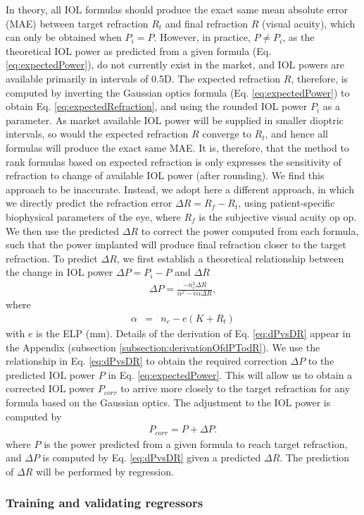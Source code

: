 \documentclass[article,twocolumn,preprint,10pt]{paper}%
\renewcommand{\(}{\left(}
\renewcommand{\)}{\right)}
\renewcommand{\[}{\left[}
\renewcommand{\]}{\right]}
\newcommand{\beq}{\begin{eqnarray}}
\newcommand{\eeq}{\end{eqnarray}}
\newcommand{\1}{\mbox{\boldmath$1$}}
\begin{document}
In theory, all IOL formulas should produce the exact same mean absolute error (MAE) between target refraction $R_t$ and final refraction $R$ (visual acuity), which can only be obtained when $P_i= P $. However, in practice, $P\neq P_i$, as the theoretical IOL power as predicted from a given formula (Eq. \ref{eq:expectedPower}), do not currently exist in the market, and IOL powers are  available primarily in intervals of 0.5D. The expected refraction $R$, therefore, is  computed by inverting the Gaussian optics formula (Eq. \ref{eq:expectedPower}) to obtain Eq. \ref{eq:expectedRefraction}, and using the rounded IOL power $P_i$  as a parameter.
As market available IOL power will be supplied in smaller dioptric intervals, so would the expected refraction $R$ converge to $R_t$, and hence all formulas will produce the exact same MAE. 
It is, therefore, that the method to rank formulas based on expected refraction is only expresses the sensitivity of refraction to change of available IOL power (after rounding). We find this approach to be inaccurate. 
Instead, we adopt here a different approach, in which we directly predict the refraction error $\Delta R = R_f-R_t$, using patient-specific biophysical parameters of the eye, where $R_f$ is the subjective visual acuity op op. We then use the predicted $\Delta R$ to correct the power  computed from each formula, such that the power implanted will produce final refraction closer to the target refraction. 
To predict $\Delta R$, we first establish a theoretical relationship between the change in IOL power $\Delta P=P_i-P$ and $\Delta R $ 
\beq \label{eq:dPvsDR}
\Delta P = \frac{-n_c^2\Delta R}{\alpha^2 -e\alpha\Delta R},
\eeq 
where 
\beq 
\alpha &=& n_c-e(K+R_t)\nonumber 
\eeq 
with $e$ is the ELP (mm). Details of the derivation of Eq. \ref{eq:dPvsDR} appear in the Appendix (subsection \ref{subsection:derivationOfdPTodR}).
We use the relationship in Eq. \ref{eq:dPvsDR} to obtain the required correction $\Delta P$ to the predicted  IOL power $P$ in Eq. \ref{eq:expectedPower}. This will allow us to obtain a corrected IOL power $P_{corr}$ to arrive more closely to the target refraction for any formula based on the Gaussian optics. The adjustment to the IOL power is computed by
\beq \label{eq:correctedPower}
P_{corr} = P+\Delta P.
\eeq 
where $P$ is the power predicted from a given formula to reach target refraction, and $\Delta P$ is computed by Eq. \ref{eq:dPvsDR} given a predicted $\Delta R$. The prediction of $\Delta R$ will be performed by regression. 

\subsubsection{Training and validating regressors}\label{subsection:regressorsTrainingAndValidation}
\end{document}
